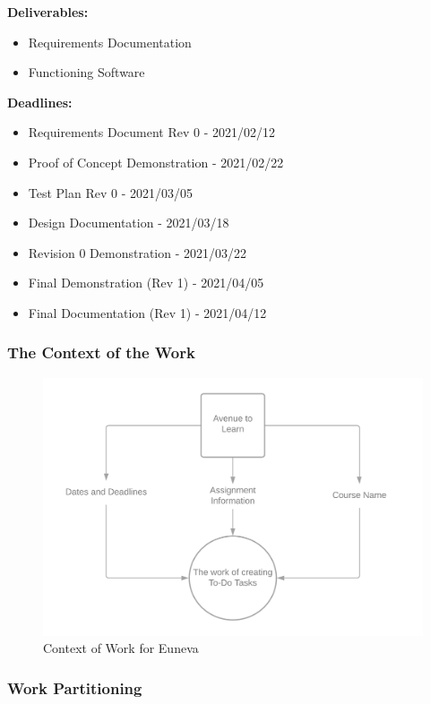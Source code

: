\documentclass[12pt, titlepage]{article}
\begin{document}
\noindent \textbf{Deliverables:}
\begin{itemize}
\item Requirements Documentation
\item Functioning Software
\end{itemize}

\noindent \textbf{Deadlines:}
\begin{itemize}
\item Requirements Document Rev 0 - 2021/02/12
\item Proof of Concept Demonstration - 2021/02/22
\item Test Plan Rev 0 - 2021/03/05
\item Design Documentation - 2021/03/18
\item Revision 0 Demonstration - 2021/03/22
\item Final Demonstration (Rev 1) - 2021/04/05
\item Final Documentation (Rev 1) - 2021/04/12 
\end{itemize}

\subsubsection{The Context of the Work}

\begin{figure}[H]
\includegraphics[scale=0.2]{Context_Of_Work}
\caption{Context of Work for Euneva}
\end{figure}

\subsubsection{Work Partitioning}
\end{document}
